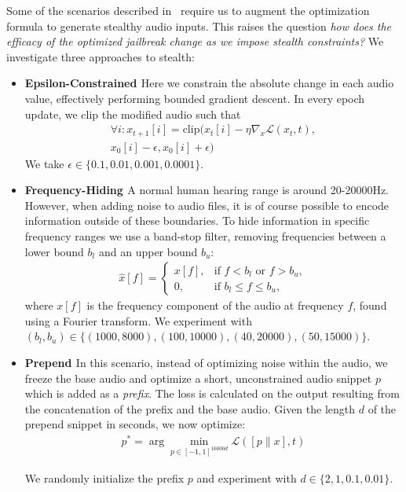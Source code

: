 Some of the scenarios described in~ require us to augment the optimization formula to generate stealthy audio inputs. This raises the question \textit{how does the efficacy of the optimized jailbreak change as we impose stealth constraints?} We investigate three approaches to stealth:

\begin{itemize}
    \item \textbf{Epsilon-Constrained \cite{qi2023visualadversarialexamplesjailbreak}} Here we constrain the absolute change in each audio value, effectively performing bounded gradient descent. In every epoch update, we clip the modified audio such that \begin{gather*}
    \forall i: x_{t+1}[i] = \text{clip}(x_t[i] - \eta \nabla_x \mathcal{L}(x_t, t), \\ x_0[i] - \epsilon, x_0[i] + \epsilon)
    \end{gather*}
    We take $\epsilon \in \{0.1, 0.01, 0.001, 0.0001\}$.
    \item \textbf{Frequency-Hiding \cite{schönherr2018adversarialattacksautomaticspeech}} A normal human hearing range is around 20-20000Hz. However, when adding noise to audio files, it is of course possible to encode information outside of these boundaries. To hide information in specific frequency ranges we use a band-stop filter, removing frequencies between a lower bound $b_l$ and an upper bound $b_u$:
    \begin{gather*}
        \hat{x}[f] = 
        \begin{cases} 
        x[f], & \text{if } f < b_l \text{ or } f > b_u, \\
        0, & \text{if } b_l \leq f \leq b_u,
        \end{cases}
    \end{gather*} where $x[f]$ is the frequency component of the audio at frequency $f$, found using a Fourier transform. We experiment with $(b_l, b_u) \in \{(1000, 8000), (100, 10000), (40, 20000), (50, 15000)\}$.
    \item \textbf{Prepend \cite{rainamuting}} In this scenario, instead of optimizing noise within the audio, we freeze the base audio and optimize a short, unconstrained audio snippet $p$ which is added as a \textit{prefix}. The loss is calculated on the output resulting from the concatenation of the prefix and the base audio. Given the length $d$ of the prepend snippet in seconds, we now optimize:
    \begin{gather*}
        p^* = \arg\min_{p \in [-1, 1]^{16000d}} \mathcal{L}([p \| x], t)
    \end{gather*}

    We randomly initialize the prefix $p$ and experiment with $d\in\{2, 1, 0.1, 0.01\}$. 
\end{itemize}
